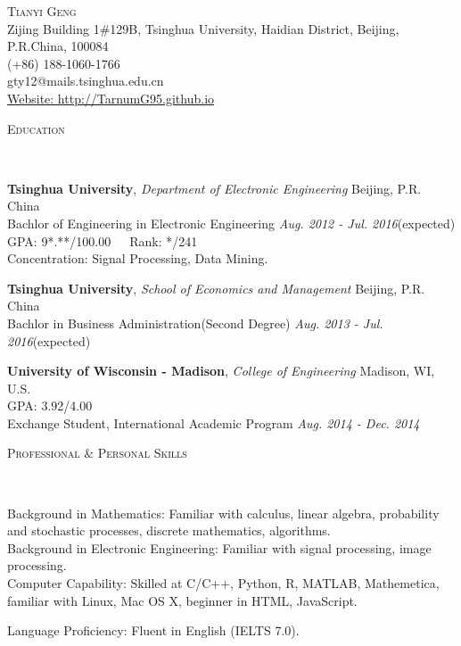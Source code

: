 \documentclass[9pt]{article}
\newenvironment{changemargin}[2]{%
  \begin{list}{}{%
    \setlength{\topsep}{0pt}%
    \setlength{\leftmargin}{#1}%
    \setlength{\rightmargin}{#2}%
    \setlength{\listparindent}{\parindent}%
    \setlength{\itemindent}{\parindent}%
    \setlength{\parsep}{\parskip}%
  }%
  \item[]}{\end{list}
}
\newcommand{\lineover}{
	\begin{changemargin}{-0.05in}{-0.05in}
		\vspace*{-8pt}
		\hrulefill \\
		\vspace*{-2pt}
	\end{changemargin}
}
\newcommand{\header}[1]{
	\begin{changemargin}{-0.5in}{-0.5in}
		\scshape{#1}\\
  	\lineover
	\end{changemargin}
}
\newcommand{\contact}[5]{
	\begin{changemargin}{-0.5in}{-0.5in}
		\begin{center}
			{\Large \scshape {#1}}\\ \smallskip
			{#2}\\ \smallskip 
			{#3}\\ \smallskip
			{#4}\\ \smallskip
			{#5}\smallskip
		\end{center}
	\end{changemargin}
}
\newenvironment{body} {
	\vspace*{-16pt}
	\begin{changemargin}{-0.25in}{-0.5in}
  }	
	{\end{changemargin}
}
\begin{document}
\contact{Tianyi Geng}{Zijing Building 1\#129B, Tsinghua University, Haidian District, Beijing, P.R.China, 100084}{(+86) 188-1060-1766}{gty12@mails.tsinghua.edu.cn}{\href{http://TarnumG95.github.io}{Website: http://TarnumG95.github.io}}

\header{Education}

\begin{body}
	\vspace{14pt}

	\textbf{Tsinghua University}, \emph{Department of Electronic Engineering} \hfill Beijing, P.R. China \\
Bachlor of Engineering in Electronic Engineering \hfill \emph{Aug. 2012 - Jul. 2016}(expected){} \\
GPA: 9*.**/100.00\ \ \ Rank: */241\\
Concentration: Signal Processing, Data Mining. \\
\vspace{6pt}

	\textbf{Tsinghua University}, \emph{School of Economics and Management} \hfill Beijing, P.R. China \\
Bachlor in Business Administration(Second Degree) \hfill \emph{Aug. 2013 - Jul. 2016}(expected){} \\
\vspace{6pt}

	\textbf{University of Wisconsin - Madison}, \emph{College of Engineering} \hfill Madison, WI, U.S. \\
GPA: 3.92/4.00\\
Exchange Student, International Academic Program \hfill \emph{Aug. 2014 - Dec. 2014}{} \\

\end{body}

\smallskip
\smallskip

\header{Professional \& Personal Skills}

\begin{body}
	\vspace{14pt}
	Background in Mathematics: Familiar with calculus, linear algebra, probability and stochastic processes, discrete mathematics, algorithms.\\
	\smallskip
	Background in Electronic Engineering: Familiar with signal processing, image processing.\\
	\smallskip
	Computer Capability: Skilled at C/C++, Python, R, MATLAB, Mathemetica, familiar with Linux, Mac OS X, beginner in HTML, JavaScript.\\
	\smallskip

	Language Proficiency: Fluent in English (IELTS 7.0).\\
\end{body}
\smallskip
\smallskip
\end{document}
